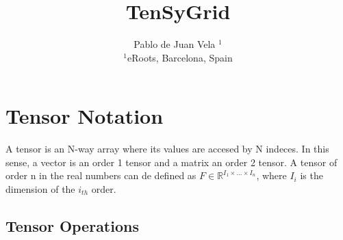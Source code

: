 \documentclass{article}
\title{TenSyGrid}
\author{Pablo de Juan Vela $^{1}$ \\
        \small $^{1}$eRoots, Barcelona, Spain \\
}
\date{}
\begin{document}
\maketitle
\begin{abstract} 
\end{abstract}

\section{Tensor Notation}

A tensor is an N-way array where its values are accesed by N indeces. In this sense, a vector is an order 1 tensor and a matrix an order 2 tensor.
A tensor of order n in the real numbers can de defined as $F \in \mathbb{R}^{I_1 \times ... \times I_n}$, where $I_i$ is the dimension of the $i_{th}$ order.



\subsection{Tensor Operations}
\end{document}
